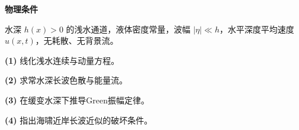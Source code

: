 \textbf{物理条件}\par 水深 \(h(x)>0\) 的浅水通道，液体密度常量，波幅 \(|\eta|\ll h\)，水平深度平均速度 \(u(x,t)\)，无耗散、无背景流。
\par\noindent\textbf{(1)} 线化浅水连续与动量方程。
\par\noindent\textbf{(2)} 求常水深长波色散与能量流。
\par\noindent\textbf{(3)} 在缓变水深下推导Green振幅定律。
\par\noindent\textbf{(4)} 指出海啸近岸长波近似的破坏条件。
